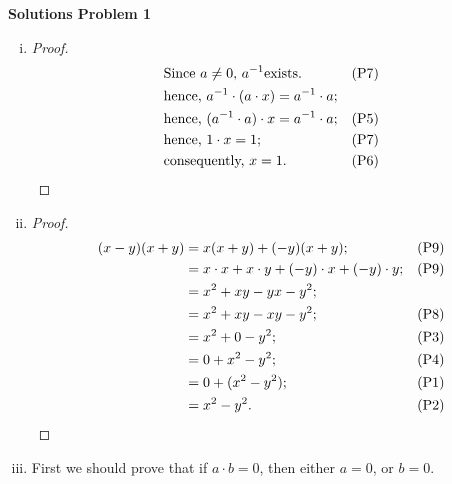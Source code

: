 \documentclass{article}
\begin{document}
    \textbf{Solutions Problem 1}
    \begin{enumerate}[(i).]
        \item
            \begin{proof}
                \begin{align*}
                    &\text{Since } a \neq 0 \text{, } a^{-1} \text{exists.} &&\text{(P7)}\\
                    &\text{hence, } a^{-1} \cdot (a \cdot x) = a^{-1} \cdot a \text{;}\\
                    &\text{hence, } (a^{-1} \cdot a) \cdot x = a^{-1} \cdot a \text{;} &&\text{(P5)}\\
                    &\text{hence, } 1 \cdot x = 1 \text{;} &&\text{(P7)}\\
                    &\text{consequently, } x = 1 \text{.} &&\text{(P6)} \qedhere
                \end{align*}
            \end{proof}
        \item
            \begin{proof}
                \begin{align*}
                    (x - y)(x + y) &= x(x + y) + (-y)(x + y) \text{;} &&\text{(P9)}\\
                    &= x \cdot x + x \cdot y + (-y) \cdot x + (-y) \cdot y \text{;} &&\text{(P9)}\\
                    &= x^{2} + xy -yx - y^{2} \text{;}\\
                    &= x^{2} + xy - xy - y^{2} \text{;} &&\text{(P8)}\\
                    &= x^{2} + 0 - y^{2} \text{;} &&\text{(P3)}\\
                    &= 0 + x^{2} - y^{2} \text{;} &&\text{(P4)}\\
                    &= 0 + (x^{2} - y^{2}) \text{;} &&\text{(P1)}\\
                    &= x^2 - y^{2} \text{.} &&\text{(P2)} \qedhere
                \end{align*}
            \end{proof}
        \item
            First we should prove that if \(a \cdot b = 0\), then either \(a = 0\), or \(b = 0\).


\end{enumerate}
\end{document}
